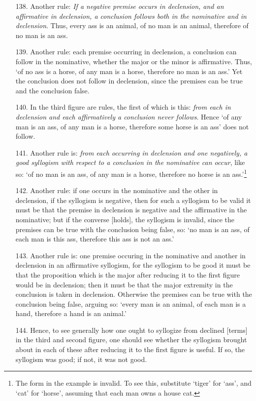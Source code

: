 \documentclass[]{article}
\begin{document}
\begin{itemize}
\item[138.] Another rule: \textit{If a negative premise occurs in declension, and an affirmative in declension, a conclusion follows both in the nominative and in declension}. Thus, every ass is an animal, of no man is an animal, therefore of no man is an ass.
\item[139.] Another rule: each premise occurring in declension, a conclusion can follow in the nominative, whether the major or the minor is affirmative. Thus, `of no ass is a horse, of any man is a horse, therefore no man is an ass.' Yet the conclusion does not follow in declension, since the premises can be true and the conclusion false.
\item[140.] In the third figure are rules, the first of which is this: \textit{from each in declension and each affirmatively a conclusion never follows}. Hence `of any man is an ass, of any man is a horse, therefore some horse is an ass' does not follow. 
\item[141.] Another rule is: \textit{from each occurring in declension and one negatively, a good syllogism with respect to a conclusion in the nominative can occur}, like so: `of no man is an ass, of any man is a horse, therefore no horse is an ass.'\footnote{The form in the example is invalid. To see this, substitute `tiger' for `ass', and `cat' for `horse', assuming that each man owns a house cat.}
\item[142.] Another rule: if one occurs in the nominative and the other in declension, if the syllogism is negative, then for such a syllogism to be valid it must be that the premise in declension is negative and the affirmative in the nominative; but if the converse [holds], the syllogism is invalid, since the premises can be true with the conclusion being false, so: `no man is an ass, of each man is this ass, therefore this ass is not an ass.' 
\item[143.] Another rule is: one premise occuring in the nominative and another in declension in an affirmative syllogism, for the syllogism to be good it must be that the proposition which is the major after reducing it to the first figure would be in declension; then it must be that the major extremity in the conclusion is taken in declension. Otherwise the premises can be true with the conclusion being false, arguing so: `every man is an animal, of each man is a hand, therefore a hand is an animal.' 
\item[144.] Hence, to see generally how one ought to syllogize from declined [terms] in the third and second figure, one should see whether the syllogism brought about in each of these after reducing it to the first figure is useful. If so, the syllogism was good; if not, it was not good.
\end{itemize}
\end{document}
